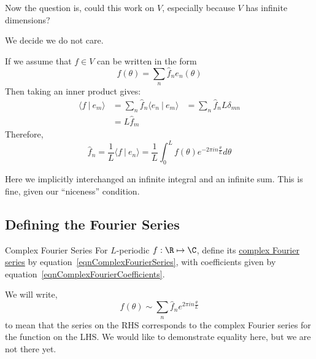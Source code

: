 \documentclass[../Main.tex]{subfiles}
\begin{document}
Now the question is, could this work on $V$, especially because $V$ has infinite dimensions?

We decide we do not care.

If we assume that $f \in V$ can be written in the form
\begin{equation}
    f(\theta) = \sum_n \hat{f}_n e_n(\theta)
    \label{eqnComplexFourierSeries}
\end{equation}
Then taking an inner product gives:
\begin{align*}
    \langle f~|~e_m\rangle &= \sum_n \hat{f}_n \langle e_n~|~e_m\rangle
    &= \sum_n \hat{f}_n L\delta_{mn} \\
    &= L\hat{f}_m
\end{align*}
Therefore,
\begin{equation}
    \hat{f}_n = \frac{1}{L}\langle f~|~e_n\rangle = \frac{1}{L} \int_0^L f(\theta) e^{-2\pi in\frac{\theta}{L}}d\theta
    \label{eqnComplexFourierCoefficients}
\end{equation}
\begin{warning}
    Here we implicitly interchanged an infinite integral and an infinite sum. This is fine, given our ``niceness'' condition.
\end{warning}
\subsection{Defining the Fourier Series}
\begin{definition}{Complex Fourier Series}
    For $L$-periodic $f : \R \mapsto \C$, define its \underline{complex Fourier series} by equation~\ref{eqnComplexFourierSeries}, with coefficients given by equation~\ref{eqnComplexFourierCoefficients}.
\end{definition}
We will write,
\begin{equation*}
    f(\theta) \sim \sum_n \hat{f}_n e^{2\pi i n \frac{\theta}{L}}
\end{equation*}
to mean that the series on the RHS corresponds to the complex Fourier series for the function on the LHS. We would like to demonstrate equality here, but we are not there yet.
\end{document}
